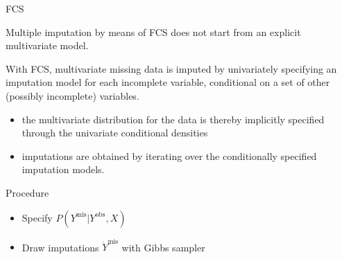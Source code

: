 \documentclass[ignorenonframetext,]{beamer}
\providecommand{\tightlist}{%
  \setlength{\itemsep}{0pt}\setlength{\parskip}{0pt}}
\begin{document}
\begin{frame}{FCS}
\protect\hypertarget{fcs}{}

Multiple imputation by means of FCS does not start from an explicit
multivariate model.

 With FCS, multivariate missing data is imputed by univariately
specifying an imputation model for each incomplete variable, conditional
on a set of other (possibly incomplete) variables.

\begin{itemize}
\tightlist
\item
  the multivariate distribution for the data is thereby implicitly
  specified through the univariate conditional densities
\item
  imputations are obtained by iterating over the conditionally specified
  imputation models.
\end{itemize}

\begin{block}{Procedure}

\begin{itemize}
\tightlist
\item
  Specify \(P(Y^\mathrm{mis} | Y^\mathrm{obs}, X)\)
\item
  Draw imputations \(\dot Y^\mathrm{mis}\) with Gibbs sampler
\end{itemize}

\end{block}

\end{frame}
\end{document}
